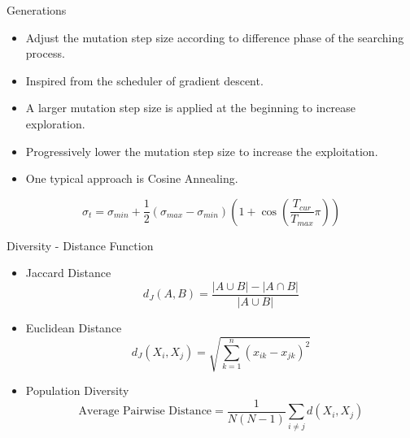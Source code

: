     \begin{frame}{Generations}
        \begin{itemize}
            \item Adjust the mutation step size according to difference phase of the searching process.
            \item Inspired from the scheduler of gradient descent.
            \item A larger mutation step size is applied at the beginning to increase exploration.
            \item Progressively lower the mutation step size to increase the exploitation.
            \item One typical approach is Cosine Annealing. \cite{loshchilov2017sgdrstochasticgradientdescent}
        \end{itemize}
        \vspace{10pt}
        \begin{equation*}
            \sigma_t = \sigma_{min} + \frac{1}{2}(\sigma_{max} - \sigma_{min}) \left( 1 + \cos{\left( \frac{T_{cur}}{T_{max}}\pi \right)} \right)
        \end{equation*}
    \end{frame}

    \begin{frame}{Diversity - Distance Function}
        \begin{itemize}
            \item Jaccard Distance \cite{jaccard}
                \begin{equation*}
                    d_J(A, B) = \frac{|A \cup B| - |A \cap B|}{|A \cup B|}
                \end{equation*}
            \item Euclidean Distance
                \begin{equation*}
                    d_J(X_i, X_j) = \sqrt{\sum^n_{k=1} (x_{ik} - x_{jk})^2}
                \end{equation*}
            \item Population Diversity 
                \begin{equation*}
                    \textrm{Average Pairwise Distance} = \frac{1}{N(N-1)} \sum_{i \neq j} d(X_i, X_j)
                \end{equation*}
        \end{itemize}
    \end{frame}

